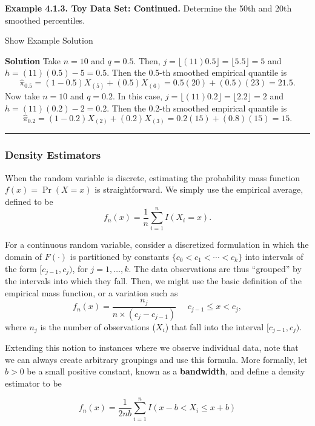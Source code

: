 \documentclass[]{book}
\theoremstyle{definition}
\theoremstyle{definition}
\theoremstyle{definition}
\theoremstyle{remark}
\begin{document}
\textbf{Example 4.1.3. Toy Data Set: Continued.} Determine the 50th and
20th smoothed percentiles.

Show Example Solution

\hypertarget{toggleExampleSelect.1.3}{}
\textbf{Solution} Take \(n=10\) and \(q=0.5\). Then,
\(j=\lfloor(11)0.5 \rfloor= \lfloor5.5 \rfloor=5\) and
\(h=(11)(0.5)-5=0.5\). Then the 0.5-th smoothed empirical quantile is
\[\hat{\pi}_{0.5} = (1-0.5) X_{(5)} + (0.5) X_{(6)} = 0.5 (20) + (0.5)(23) = 21.5.\]
Now take \(n=10\) and \(q=0.2\). In this case,
\(j=\lfloor(11)0.2\rfloor=\lfloor 2.2 \rfloor=2\) and
\(h=(11)(0.2)-2=0.2\). Then the 0.2-th smoothed empirical quantile is
\[\hat{\pi}_{0.2} = (1-0.2) X_{(2)} + (0.2) X_{(3)} = 0.2 (15) + (0.8)(15) = 15.\]

\begin{center}\rule{0.5\linewidth}{\linethickness}\end{center}

\subsubsection{Density Estimators}\label{density-estimators}

When the random variable is discrete, estimating the probability mass
function \(f(x) = \Pr(X=x)\) is straightforward. We simply use the
empirical average, defined to be
\[f_n(x) = \frac{1}{n} \sum_{i=1}^n I(X_i = x).\]

For a continuous random variable, consider a discretized formulation in
which the domain of \(F(\cdot)\) is partitioned by constants
\(\{c_0 < c_1 < \cdots < c_k\}\) into intervals of the form
\([c_{j-1}, c_j)\), for \(j=1, \ldots, k\). The data observations are
thus ``grouped'' by the intervals into which they fall. Then, we might
use the basic definition of the empirical mass function, or a variation
such as
\[f_n(x) = \frac{n_j}{n \times (c_j - c_{j-1})}  \ \ \ \ \ \ c_{j-1} \le x < c_j,\]
where \(n_j\) is the number of observations (\(X_i\)) that fall into the
interval \([c_{j-1}, c_j)\).

Extending this notion to instances where we observe individual data,
note that we can always create arbitrary groupings and use this formula.
More formally, let \(b>0\) be a small positive constant, known as a
\textbf{bandwidth}, and define a density estimator to be

\begin{equation} 
  f_n(x) = \frac{1}{2nb} \sum_{i=1}^n I(x-b < X_i \le x + b)
  \label{eq:KDF}
\end{equation}
\end{document}
